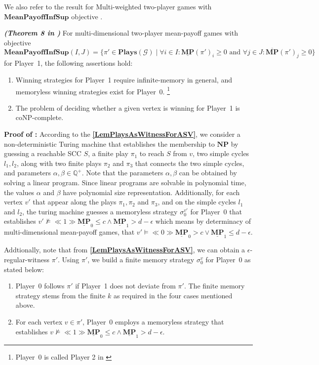 \noindent We also refer to the result for Multi-weighted two-player games with $\mathbf{MeanPayoffInfSup}$ objective \cite{VCDHRR15}.

\begin{theorem}
    \label{ThmMemlessStrForP2}
    \textbf{\emph{(Theorem 8 in \cite{VCDHRR15})}} For multi-dimensional two-player mean-payoff games with objective \\
    $\mathbf{MeanPayoffInfSup}(I,J) = \{\pi' \in \mathbf{Plays}(\mathcal{G}) \mid \forall i \in I : \underline{\mathbf{MP}}(\pi')_i \geqslant 0 \text{ and } \forall j \in J : \overline{\mathbf{MP}}(\pi')_j \geqslant 0\}$ for Player~1, the following assertions hold:
    \begin{enumerate}
        \item Winning strategies for Player~1 require infinite-memory in general, and memoryless winning strategies exist for Player~0. \footnote{Player~0 is called Player 2 in \cite{FGR20}}
        \item The problem of deciding whether a given vertex is winning for Player~1 is coNP-complete.
    \end{enumerate}
\end{theorem}

\textbf{Proof of :} According to the \textbf{\cref{LemPlaysAsWitnessForASV}}, we consider a non-deterministic Turing machine that establishes the membership to $\mathbf{NP}$ by guessing a reachable SCC $S$, a finite play $\pi_1$ to reach $S$ from $v$, two simple cycles $l_1, l_2$, along with two finite plays $\pi_2$ and $\pi_3$ that connects the two simple cycles, and parameters $\alpha, \beta \in \mathbb{Q}^{+}$. Note that the parameters $\alpha , \beta$ can be obtained by solving a linear program. Since linear programs are solvable in polynomial time, the values $\alpha$ and $\beta$ have polynomial size representation. Additionally, for each vertex $v'$ that appear along the plays $\pi_1, \pi_2$ and $\pi_3$, and on the simple cycles $l_1$ and $l_2$, the turing machine guesses a memoryless strategy $\sigma_0^{v'}$ for Player~0 that establishes $v' \nvDash \ll 1 \gg \underline{\textbf{MP}}_0 \leqslant c \land \underline{\textbf{MP}}_1 > d - \epsilon$ which means by determinacy of multi-dimensional mean-payoff games, that $v' \models \ll 0 \gg \underline{\textbf{MP}}_0 > c \lor \underline{\textbf{MP}}_1 \leqslant d - \epsilon$. 

Addtionally, note that from \textbf{\cref{LemPlaysAsWitnessForASV}}, we can obtain a $\epsilon$-regular-witness $\pi'$. Using $\pi'$, we build a finite memory strategy $\sigma_0^v$ for Player~0 as stated below:
\begin{enumerate}
    \item Player~0 follows $\pi'$ if Player~1 does not deviate from $\pi'$. The finite memory strategy stems from the finite $k$ as required in the four cases mentioned above.
    \item For each vertex $v \in \pi'$, Player~0 employs a memoryless strategy that establishes $v \nvDash \ll 1 \gg \underline{\mathbf{MP}}_0 \leqslant c \land \underline{\mathbf{MP}}_1 > d-\epsilon$.
\end{enumerate}

